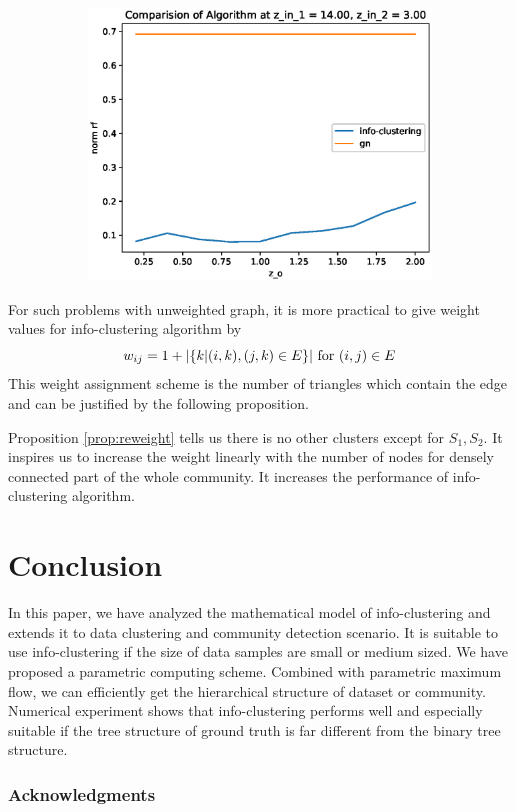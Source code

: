 \documentclass{article}
\begin{document}
\begin{figure}
\begin{subfigure}{0.33\textwidth}
		\includegraphics[width=\textwidth]{pic/z_o.eps}
		\caption{}
	\end{subfigure}
	\caption{}\label{fig:cdr}	
\end{figure}

For such problems with unweighted graph, it is more practical to give weight values for info-clustering algorithm by 
\begin{equation}
    w_{ij} = 1 + \lvert\{k | (i,k),(j,k) \in E \}\rvert \textrm{ for } (i,j) \in E
\end{equation}
This weight assignment scheme is the number of triangles which contain the edge and can be justified by the following proposition.



Proposition \ref{prop:reweight} tells us there is no other clusters except for $S_1, S_2$. It inspires us to increase the weight linearly with the number of nodes for densely connected part of the whole community. It increases the performance of info-clustering algorithm.



\section{Conclusion}\label{sec:conclusion}
In this paper, we have analyzed the mathematical model of info-clustering and extends it to data clustering and community detection scenario. It is suitable to use info-clustering if the size of data samples are small or medium sized. We have proposed a parametric computing scheme. Combined with parametric maximum flow, we can efficiently get the hierarchical structure of dataset or community. Numerical experiment shows that info-clustering performs well and especially suitable if the tree structure of ground truth is far different from the binary tree structure.

\subsubsection*{Acknowledgments}





\end{document}
